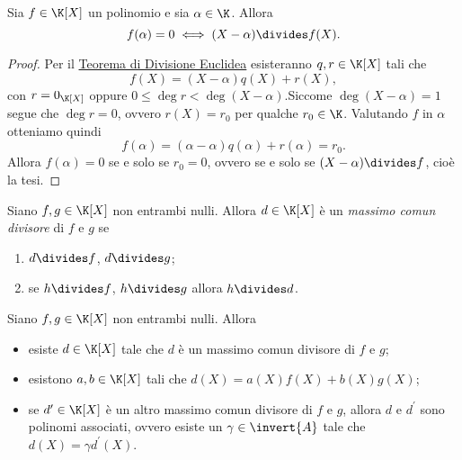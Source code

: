 \begin{theorem}
     \label{th:ruffini}
    Sia $f \in \K[X]$ un polinomio e sia $\alpha \in \K$. Allora \begin{equation}
        f(\alpha) = 0 \iff (X - \alpha) \divides f(X).
    \end{equation}
\end{theorem}
\begin{proof}
    Per il \hyperref[th:divisione_euclidea_KX]{Teorema di Divisione Euclidea} esisteranno $q, r \in \K[X]$ tali che \[
        f(X) = (X - \alpha)q(X) + r(X),   
    \] con $r = 0_{\K[X]}$ oppure $0 \leq \deg r < \deg (X - \alpha)$.Siccome $\deg (X - \alpha) = 1$ segue che $\deg r = 0$, ovvero $r(X) = r_0$ per qualche $r_0 \in \K$. Valutando $f$ in $\alpha$ otteniamo quindi \[
        f(\alpha) = (\alpha - \alpha)q(\alpha) + r(\alpha) = r_0.    
    \] Allora $f(\alpha) = 0$ se e solo se $r_0 = 0$, ovvero se e solo se $(X-\alpha) \divides f$, cioè la tesi.
\end{proof}

\begin{definition}
    Siano $f, g \in \K[X]$ non entrambi nulli. Allora $d \in \K[X]$ è un \emph{massimo comun divisore} di $f$ e $g$ se \begin{enumerate}[label={(\roman*)}]
        \item $d \divides f$, $d \divides g$;
        \item se $h \divides f$, $h \divides g$ allora $h \divides d$.
    \end{enumerate}
\end{definition}

\begin{theorem}
    Siano $f, g \in \K[X]$ non entrambi nulli. Allora \begin{itemize}
        \item esiste $d \in \K[X]$ tale che $d$ è un massimo comun divisore di $f$ e $g$;
        \item esistono $a, b \in \K[X]$ tali che $d(X) = a(X)f(X) + b(X)g(X)$;
        \item se $d^\prime \in \K[X]$ è un altro massimo comun divisore di $f$ e $g$, allora $d$ e $d^\prime$ sono polinomi associati, ovvero esiste un $\gamma \in \invert{A}$ tale che $d(X) = \gamma d^\prime(X)$.
    \end{itemize}
\end{theorem}

